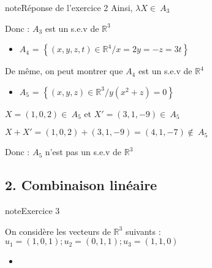 \documentclass[letterpaper,10pt,french]{jupyterBook}
\begin{document}
\begin{sphinxadmonition}{note}{Réponse de l’exercice 2}
\sphinxAtStartPar
Ainsi, \(\lambda X \in ~A_3\)

\sphinxAtStartPar
Donc : \(A_3\) est un s.e.v de \(\mathbb{R}^3\)
\begin{itemize}
\item {} 
\sphinxAtStartPar
\(A_4\) = \( \left\{ (x,y,z, t) \in \mathbb{R}^4 / x = 2y= -z=3t \right\}\)

\end{itemize}

\sphinxAtStartPar
De même, on peut montrer que \(A_4\) est un s.e.v de \(\mathbb{R}^4\)
\begin{itemize}
\item {} 
\sphinxAtStartPar
\(A_5\) = \( \left\{ (x,y,z) \in \mathbb{R}^3 / y(x^2+z) = 0 \right\}\)

\end{itemize}

\sphinxAtStartPar
\(X= (1,0,2) \in ~A_5\) et \( X'=(3,1, -9) \in ~A_5\)

\sphinxAtStartPar
\(X + X'= (1,0,2)+(3,1, -9) = (4, 1, -7) \notin ~A_5\)

\sphinxAtStartPar
Donc : \(A_5\) n’est pas un s.e.v de \(\mathbb{R}^3\)
\end{sphinxadmonition}


\subsection{2. Combinaison linéaire}
\label{\detokenize{S_xe9rie1:combinaison-lineaire}}
\begin{sphinxadmonition}{note}{Exercice 3}

\sphinxAtStartPar
On considère les vecteurs de \(\mathbb{R}^3\) suivants :
\(
u_1=(1,0,1) ; u_2=(0,1,1) ; u_3=(1,1,0)
\)
\begin{itemize}
\item {} 
\sphinxAtStartPar
{}

\end{itemize}
\end{sphinxadmonition}
\end{document}
